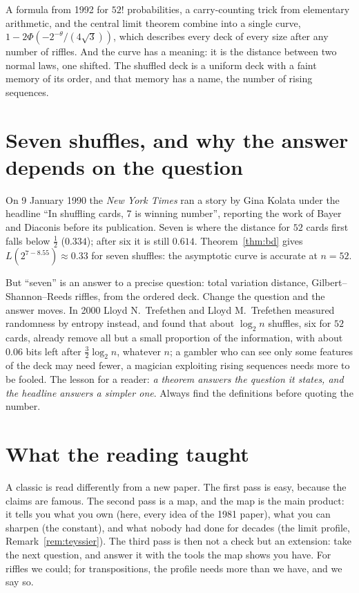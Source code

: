 \begin{beauty}
A formula from 1992 for $52!$ probabilities, a carry-counting trick from elementary arithmetic, and the central limit theorem combine into a
single curve, $1-2\Phi(-2^{-\theta}/(4\sqrt3))$, which describes every deck of every size after any number of riffles. And the curve has a meaning: it is
the distance between two normal laws, one shifted. The shuffled deck is a uniform deck with a faint memory of its order, and that memory has
a name, the number of rising sequences.
\end{beauty}

\section{Seven shuffles, and why the answer depends on the question}

On 9 January 1990 the \emph{New York Times} ran a story by Gina Kolata under the headline ``In shuffling cards, 7 is winning number'', reporting
the work of Bayer and Diaconis before its publication. Seven is where the distance for $52$ cards first falls below $\frac12$ ($0.334$); after six it is
still $0.614$. Theorem~\ref{thm:bd} gives $L(2^{7-8.55})\approx0.33$ for seven shuffles: the asymptotic curve is accurate at $n=52$.

But ``seven'' is an answer to a precise question: total variation distance, Gilbert--Shannon--Reeds riffles, from the ordered deck. Change the
question and the answer moves. In 2000 Lloyd N.~Trefethen and Lloyd M.~Trefethen measured randomness by entropy instead, and found that about $\log_2n$
shuffles, six for $52$ cards, already remove all but a small proportion of the information, with about $0.06$ bits left after $\frac32\log_2n$, whatever $n$; a gambler who can see only some features of the deck may need fewer, a magician exploiting rising sequences
needs more to be fooled. The lesson for a reader: \emph{a theorem answers the question it states, and the headline answers a simpler one}. Always
find the definitions before quoting the number.

\section{What the reading taught}

A classic is read differently from a new paper. The first pass is easy, because the claims are famous. The second pass is a map, and the
map is the main product: it tells you what you own (here, every idea of the 1981 paper), what you can sharpen (the constant), and what nobody had
done for decades (the limit profile, Remark~\ref{rem:teyssier}). The third pass is then not a check but an extension: take the next question, and
answer it with the tools the map shows you have. For riffles we could; for transpositions, the profile needs more than we have, and we say so.

